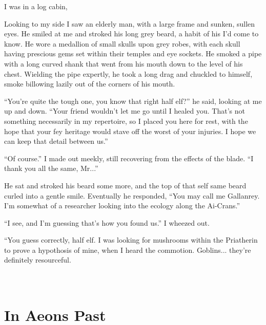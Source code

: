 \documentclass[12pt, a4paper]{book}
\begin{document}
I was in a log cabin, 

Looking to my side I saw an elderly man, with a large frame and sunken, sullen eyes. He smiled at me and stroked his long grey beard, a habit of his I'd come to know. He wore a medallion of small skulls upon grey robes, with each skull having prescious gems set within their temples and eye sockets. He smoked a pipe with a long curved shank that went from his mouth down to the level of his chest. Wielding the pipe expertly, he took a long drag and chuckled to himself, smoke billowing lazily out of the corners of his mouth.

``You're quite the tough one, you know that right half elf?'' he said, looking at me up and down. ``Your friend wouldn't let me go until I healed you. That's not something necessarily in my repertoire, so I placed you here for rest, with the hope that your fey heritage would stave off  the worst of your injuries. I hope we can keep that detail between us.''

``Of course.'' I made out meekly, still recovering from the effects of the blade. ``I thank you all the same, Mr...''

He sat and stroked his beard some more, and the top of that self same beard curled into a gentle smile. Eventually he responded, ``You may call me Gallanrey. I'm somewhat of a researcher looking into the ecology along the Ai-Crans.''

``I see, and I'm guessing that's how you found us.'' I wheezed out.

``You guess correctly, half elf. I was looking for mushrooms within the Priatherin to prove a hypothosis of mine, when I heard the commotion. Goblins... they're definitely resourceful.


\part*{
\setlength{\fboxsep}{3pt}%
\setlength{\fboxrule}{3pt}%
~\\[1cm]
In Aeons Past
}
\setcounter{chapter}{0}
\end{document}
